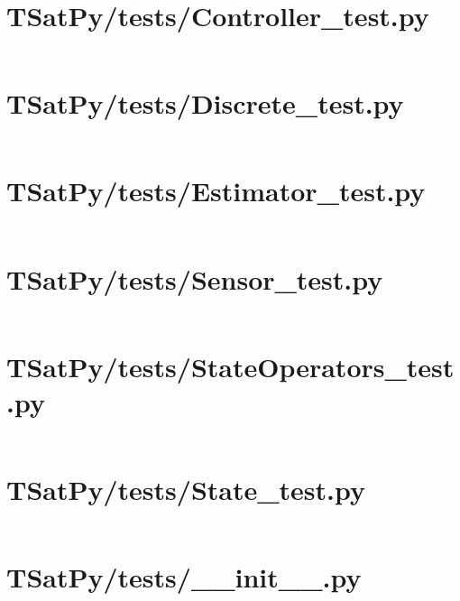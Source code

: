 \pagebreak
\section*{TSatPy/tests/Controller\_test.py}\label{code:TSatPy/tests/Controller_test.py}
\inputminted[linenos,fontsize=\scriptsize]{python}{/home/dcouture/git/mathyourlife/TSatPy/TSatPy/tests/Controller_test.py}

\pagebreak
\section*{TSatPy/tests/Discrete\_test.py}\label{code:TSatPy/tests/Discrete_test.py}
\inputminted[linenos,fontsize=\scriptsize]{python}{/home/dcouture/git/mathyourlife/TSatPy/TSatPy/tests/Discrete_test.py}

\pagebreak
\section*{TSatPy/tests/Estimator\_test.py}\label{code:TSatPy/tests/Estimator_test.py}
\inputminted[linenos,fontsize=\scriptsize]{python}{/home/dcouture/git/mathyourlife/TSatPy/TSatPy/tests/Estimator_test.py}

\pagebreak
\section*{TSatPy/tests/Sensor\_test.py}\label{code:TSatPy/tests/Sensor_test.py}
\inputminted[linenos,fontsize=\scriptsize]{python}{/home/dcouture/git/mathyourlife/TSatPy/TSatPy/tests/Sensor_test.py}

\pagebreak
\section*{TSatPy/tests/StateOperators\_test.py}\label{code:TSatPy/tests/StateOperators_test.py}
\inputminted[linenos,fontsize=\scriptsize]{python}{/home/dcouture/git/mathyourlife/TSatPy/TSatPy/tests/StateOperators_test.py}

\pagebreak
\section*{TSatPy/tests/State\_test.py}\label{code:TSatPy/tests/State_test.py}
\inputminted[linenos,fontsize=\scriptsize]{python}{/home/dcouture/git/mathyourlife/TSatPy/TSatPy/tests/State_test.py}

\pagebreak
\section*{TSatPy/tests/\_\_init\_\_.py}\label{code:TSatPy/tests/__init__.py}
\inputminted[linenos,fontsize=\scriptsize]{python}{/home/dcouture/git/mathyourlife/TSatPy/TSatPy/tests/__init__.py}
